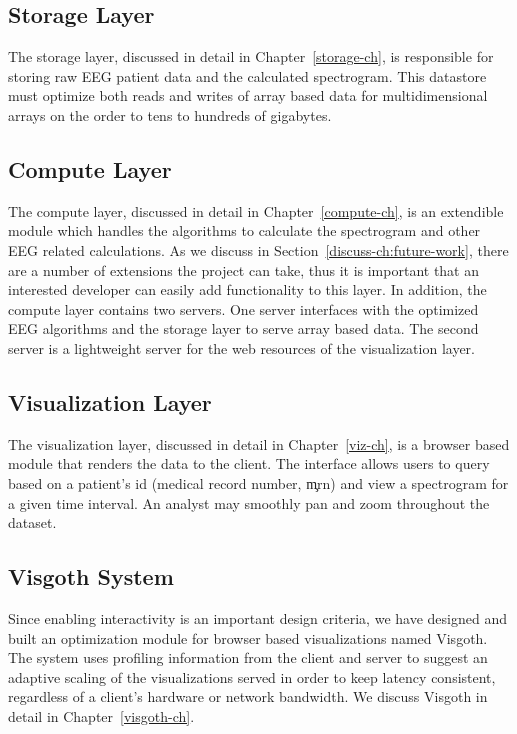 \subsection{Storage Layer}

The storage layer, discussed in detail in Chapter~\ref{storage-ch}, is
responsible for storing raw EEG patient data and the calculated spectrogram.
This datastore must optimize both reads and writes of array based data for
multidimensional arrays on the order to tens to hundreds of gigabytes.

\subsection{Compute Layer}

The compute layer, discussed in detail in Chapter~\ref{compute-ch}, is an
extendible module which handles the algorithms to calculate the spectrogram and
other EEG related calculations. As we discuss in
Section~\ref{discuss-ch:future-work}, there are a number of extensions the
project can take, thus it is important that an interested developer can easily
add functionality to this layer. In addition, the compute layer contains two
servers. One server interfaces with the optimized EEG algorithms and the
storage layer to serve array based data. The second server is a lightweight
server for the web resources of the visualization layer.

\subsection{Visualization Layer}

The visualization layer, discussed in detail in Chapter~\ref{viz-ch}, is a browser
based module that renders the data to the client. The interface allows users to
query based on a patient's id (medical record number, \c{mrn}) and view a spectrogram
for a given time interval. An analyst may smoothly pan and zoom throughout the dataset.

\subsection{Visgoth System}

Since enabling interactivity is an important design criteria, we have designed
and built an optimization module for browser based visualizations named
Visgoth. The system uses profiling information from the client and server to
suggest an adaptive scaling of the visualizations served in order to keep
latency consistent, regardless of a client's hardware or network bandwidth. We
discuss Visgoth in detail in Chapter~\ref{visgoth-ch}.


